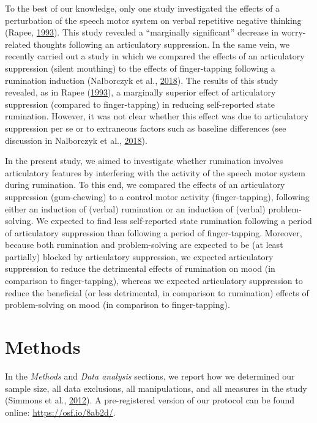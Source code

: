 \documentclass[a4paper,12pt,twoside,onecolumn,openright,final,oldfontcommands]{memoir}
\begin{document}
To the best of our knowledge, only one study investigated the effects of a perturbation of the speech motor system on verbal repetitive negative thinking (Rapee, \protect\hyperlink{ref-rapee_utilisation_1993}{1993}). This study revealed a \enquote{marginally significant} decrease in worry-related thoughts following an articulatory suppression. In the same vein, we recently carried out a study in which we compared the effects of an articulatory suppression (silent mouthing) to the effects of finger-tapping following a rumination induction (Nalborczyk et al., \protect\hyperlink{ref-nalborczyk_articulatory_2018}{2018}). The results of this study revealed, as in Rapee (\protect\hyperlink{ref-rapee_utilisation_1993}{1993}), a marginally superior effect of articulatory suppression (compared to finger-tapping) in reducing self-reported state rumination. However, it was not clear whether this effect was due to articulatory suppression per se or to extraneous factors such as baseline differences (see discussion in Nalborczyk et al., \protect\hyperlink{ref-nalborczyk_articulatory_2018}{2018}).

In the present study, we aimed to investigate whether rumination involves articulatory features by interfering with the activity of the speech motor system during rumination. To this end, we compared the effects of an articulatory suppression (gum-chewing) to a control motor activity (finger-tapping), following either an induction of (verbal) rumination or an induction of (verbal) problem-solving. We expected to find less self-reported state rumination following a period of articulatory suppression than following a period of finger-tapping. Moreover, because both rumination and problem-solving are expected to be (at least partially) blocked by articulatory suppression, we expected articulatory suppression to reduce the detrimental effects of rumination on mood (in comparison to finger-tapping), whereas we expected articulatory suppression to reduce the beneficial (or less detrimental, in comparison to rumination) effects of problem-solving on mood (in comparison to finger-tapping).

\hypertarget{methods-4}{%
\section{Methods}\label{methods-4}}

In the \emph{Methods} and \emph{Data analysis} sections, we report how we determined our sample size, all data exclusions, all manipulations, and all measures in the study (Simmons et al., \protect\hyperlink{ref-simmons_21_2012}{2012}). A pre-registered version of our protocol can be found online: \url{https://osf.io/8ab2d/}.
\end{document}
